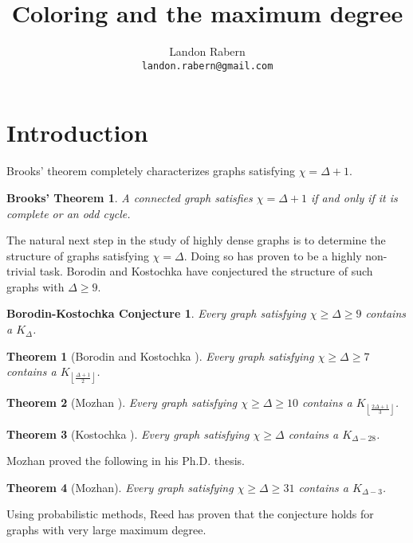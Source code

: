 \documentclass[12pt]{article}
\title{Coloring and the maximum degree}
\author{Landon Rabern\\
\small \texttt{landon.rabern@gmail.com}}
\theoremstyle{plain}
\newtheorem{thm}{Theorem}[section]
\newtheorem*{BrooksTheorem}{Brooks' Theorem}
\newtheorem*{BK}{Borodin-Kostochka Conjecture}
\theoremstyle{definition}
\theoremstyle{remark}
\newcommand{\floor}[1]{\left\lfloor#1\right\rfloor}
\begin{document}
\maketitle
\tableofcontents

\section{Introduction}
Brooks' theorem \cite{brooks1941colouring} completely characterizes graphs satisfying $\chi = \Delta + 1$.
\begin{BrooksTheorem}
A connected graph satisfies $\chi = \Delta + 1$ if and only if it is complete or an odd cycle.
\end{BrooksTheorem}

The natural next step in the study of highly dense graphs is to determine the structure of graphs satisfying $\chi = \Delta$.  Doing so has proven to be a highly non-trivial task.  Borodin and Kostochka have conjectured the structure of such graphs with $\Delta \geq 9$.

\begin{BK}
Every graph satisfying $\chi \geq \Delta \geq 9$ contains a $K_\Delta$.
\end{BK}

\begin{thm}[Borodin and Kostochka \cite{borodin1977upper}]\label{BorodinKostochkaBK}
Every graph satisfying $\chi \geq \Delta \geq 7$ contains a $K_{\floor{\frac{\Delta + 1}{2}}}$.
\end{thm}

\begin{thm}[Mozhan \cite{mozhan1983}]\label{MozhanTwoThirdsBK}
Every graph satisfying $\chi \geq \Delta \geq 10$ contains a $K_{\floor{\frac{2\Delta + 1}{3}}}$.
\end{thm}

\begin{thm}[Kostochka \cite{kostochkaRussian}]\label{KostochkaBK}
Every graph satisfying $\chi \geq \Delta$ contains a $K_{\Delta - 28}$.
\end{thm}

Mozhan proved the following in his Ph.D. thesis.

\begin{thm}[Mozhan]\label{MozhanBK}
Every graph satisfying $\chi \geq \Delta \geq 31$ contains a $K_{\Delta - 3}$.
\end{thm}

Using probabilistic methods, Reed has proven that the conjecture holds for graphs with very large maximum degree.
\end{document}
